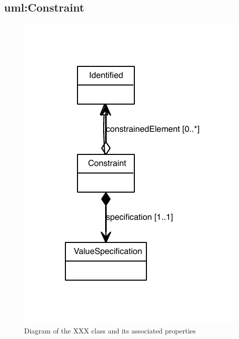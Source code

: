 
\subsection{uml:Constraint}
\label{sec:uml:Constraint}

\begin{figure}[ht]
\begin{center}
\includegraphics[scale=0.6]{uml_classes/Constraint_abstraction_hierarchy.pdf}
\caption[]{Diagram of the XXX class and its associated properties}
\label{uml:Constraint}
\end{center}
\end{figure}


